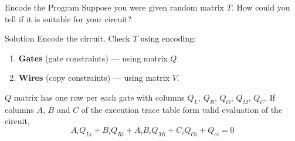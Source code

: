 \documentclass{zkdl-presentation-template}
\begin{document}
    \begin{frame}{Encode the Program}
        Suppose you were given random matrix $T$. How could you tell if it is suitable for your circuit?
        \begin{block}{Solution}
            Encode the circuit. Check $T$ using encoding:
            \begin{enumerate}
                \item \textbf{Gates} (gate constraints) --- using matrix $Q$.
                \item \textbf{Wires} (copy constraints) --- using matrix $V$.
            \end{enumerate}
        \end{block}

        \pause \begin{definition}
            $Q$ matrix has one row per each gate with columns $Q_L$, $Q_R$, $Q_O$, $Q_M$, $Q_C$. If columns $A$, $B$ and $C$ of the execution trace table form valid evaluation of the circuit, 
            \[A_i Q_{Li} + B_i Q_{Ri} + A_i B_i Q_{Mi} + C_i Q_{Oi} + Q_{ci} = 0\]
        \end{definition}
    \end{frame}
\end{document}

